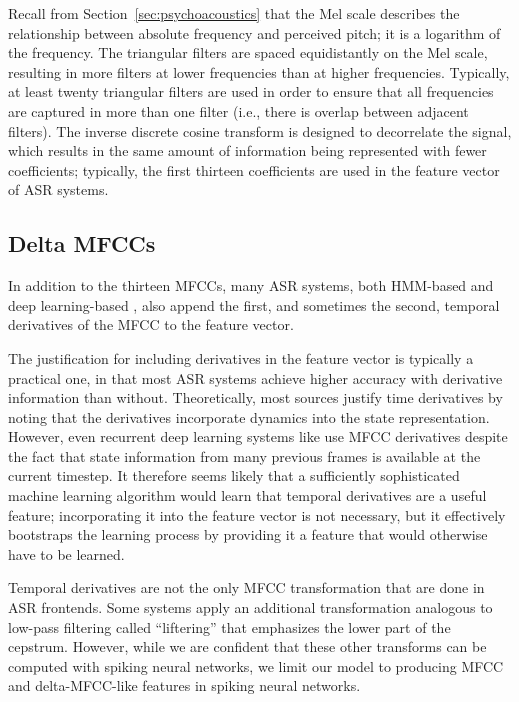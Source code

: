 Recall from Section~\ref{sec:psychoacoustics}
that the Mel scale
describes the relationship between
absolute frequency and perceived pitch;
it is a logarithm of the frequency.
The triangular filters are spaced
equidistantly on the Mel scale,
resulting in more filters
at lower frequencies than at higher frequencies.
Typically, at least twenty triangular filters
are used in order to ensure that all frequencies
are captured in more than one filter
(i.e., there is overlap between adjacent filters).
The inverse discrete cosine transform
is designed to decorrelate the signal,
which results in the same amount
of information being represented
with fewer coefficients;
typically, the first thirteen coefficients
are used in the feature vector
of ASR systems.

\subsection{Delta MFCCs}

In addition to the thirteen MFCCs,
many ASR systems,
both HMM-based \citep{hain1999,gales2008}
and deep learning-based
\citep{graves2006,graves2008,fernandez2008},
also append the first,
and sometimes the second,
temporal derivatives of the MFCC
to the feature vector.

The justification for including derivatives
in the feature vector is typically
a practical one,
in that most ASR systems
achieve higher accuracy with
derivative information than without.
Theoretically,
most sources justify time derivatives
by noting that the derivatives
incorporate dynamics into the state representation.
However,
even recurrent deep learning systems
like \citet{graves2008}
use MFCC derivatives
despite the fact that
state information from many previous frames
is available at the current timestep.
It therefore seems likely that
a sufficiently sophisticated machine learning algorithm
would learn that temporal derivatives
are a useful feature;
incorporating it into the feature vector
is not necessary,
but it effectively bootstraps the learning process
by providing it a feature
that would otherwise
have to be learned.

Temporal derivatives are not the only
MFCC transformation that are done in ASR frontends.
Some systems apply an additional transformation
analogous to low-pass filtering
called ``liftering'' that emphasizes
the lower part of the cepstrum.
However, while we are confident
that these other transforms
can be computed with spiking neural networks,
we limit our model to producing
MFCC and delta-MFCC-like features
in spiking neural networks.

